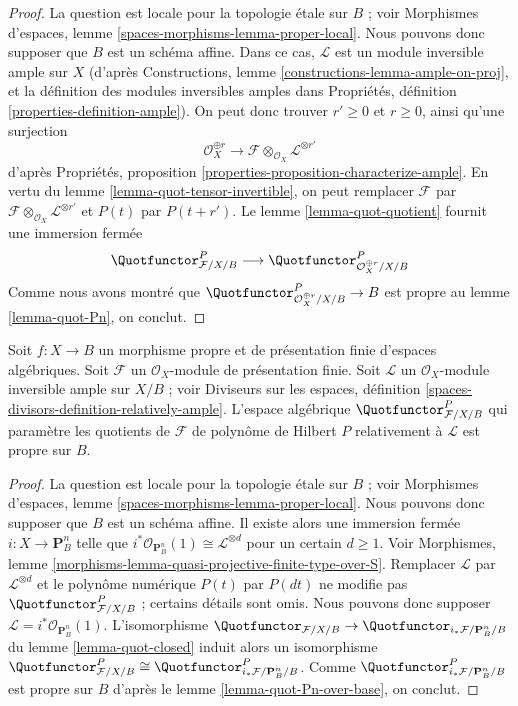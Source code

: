 \begin{proof}
La question est locale pour la topologie \'etale sur $B$ ; voir Morphismes
d'espaces, lemme \ref{spaces-morphisms-lemma-proper-local}.
Nous pouvons donc supposer que $B$ est un schéma affine.
Dans ce cas, $\mathcal{L}$ est un module inversible ample sur $X$
(d'après Constructions, lemme \ref{constructions-lemma-ample-on-proj}, et la
définition des modules inversibles amples dans Propriétés, définition
\ref{properties-definition-ample}).
On peut donc trouver $r' \geq 0$ et $r \geq 0$, ainsi qu'une surjection
$$
\mathcal{O}_X^{\oplus r} \longrightarrow
\mathcal{F} \otimes_{\mathcal{O}_X} \mathcal{L}^{\otimes r'}
$$
d'après Propriétés, proposition
\ref{properties-proposition-characterize-ample}.
En vertu du lemme \ref{lemma-quot-tensor-invertible}, on peut remplacer
$\mathcal{F}$ par
$\mathcal{F} \otimes_{\mathcal{O}_X} \mathcal{L}^{\otimes r'}$
et $P(t)$ par $P(t + r')$.
Le lemme \ref{lemma-quot-quotient} fournit une immersion fermée
$$
\Quotfunctor^P_{\mathcal{F}/X/B}
\longrightarrow
\Quotfunctor^P_{\mathcal{O}_X^{\oplus r}/X/B}
$$
Comme nous avons montré que
$\Quotfunctor^P_{\mathcal{O}_X^{\oplus r}/X/B} \to B$ est propre au lemme
\ref{lemma-quot-Pn}, on conclut.
\end{proof}

\begin{lemma}
\label{lemma-quot-proper-over-base}
Soit $f : X \to B$ un morphisme propre et de présentation finie d'espaces
algébriques. Soit $\mathcal{F}$ un $\mathcal{O}_X$-module de présentation
finie. Soit $\mathcal{L}$ un $\mathcal{O}_X$-module inversible ample sur
$X/B$ ; voir Diviseurs sur les espaces, définition
\ref{spaces-divisors-definition-relatively-ample}.
L'espace algébrique $\Quotfunctor^P_{\mathcal{F}/X/B}$ qui paramètre les
quotients de $\mathcal{F}$ de polynôme de Hilbert $P$ relativement à
$\mathcal{L}$ est propre sur $B$.
\end{lemma}

\begin{proof}
La question est locale pour la topologie \'etale sur $B$ ; voir Morphismes
d'espaces, lemme \ref{spaces-morphisms-lemma-proper-local}.
Nous pouvons donc supposer que $B$ est un schéma affine.
Il existe alors une immersion fermée $i : X \to \mathbf{P}^n_B$ telle que
$i^*\mathcal{O}_{\mathbf{P}^n_B}(1) \cong \mathcal{L}^{\otimes d}$
pour un certain $d \geq 1$. Voir Morphismes, lemme
\ref{morphisms-lemma-quasi-projective-finite-type-over-S}.
Remplacer $\mathcal{L}$ par $\mathcal{L}^{\otimes d}$ et le polynôme
numérique $P(t)$ par $P(dt)$ ne modifie pas
$\Quotfunctor^P_{\mathcal{F}/X/B}$ ; certains détails sont omis.
Nous pouvons donc supposer
$\mathcal{L} = i^*\mathcal{O}_{\mathbf{P}^n_B}(1)$.
L'isomorphisme
$\Quotfunctor_{\mathcal{F}/X/B} \to
\Quotfunctor_{i_*\mathcal{F}/\mathbf{P}^n_B/B}$ du lemme
\ref{lemma-quot-closed} induit alors un isomorphisme
$\Quotfunctor^P_{\mathcal{F}/X/B} \cong
\Quotfunctor^P_{i_*\mathcal{F}/\mathbf{P}^n_B/B}$.
Comme $\Quotfunctor^P_{i_*\mathcal{F}/\mathbf{P}^n_B/B}$ est propre sur
$B$ d'après le lemme \ref{lemma-quot-Pn-over-base}, on conclut.
\end{proof}

